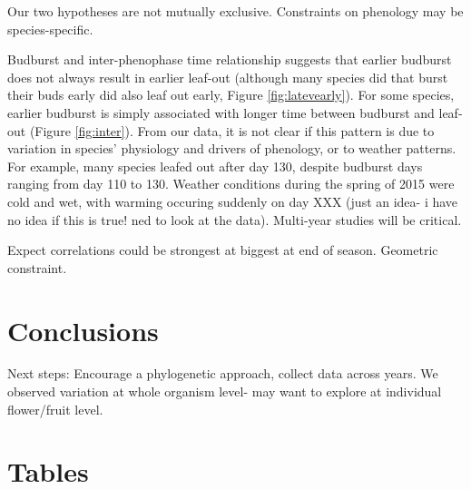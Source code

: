 \documentclass{article}
\begin{document}
\par Our two hypotheses are not mutually exclusive. Constraints on phenology may be species-specific. 
\par Budburst and inter-phenophase time relationship suggests that earlier budburst does not always result in earlier leaf-out (although many species did that burst their buds early did also leaf out early, Figure \ref{fig:latevearly}). For some species, earlier budburst is simply associated with longer time between budburst and leaf-out (Figure \ref{fig:inter}). From our data, it is not clear if this pattern is due to variation in species' physiology and drivers of phenology, or to weather patterns. For example, many species leafed out after day 130, despite budburst days ranging from day 110 to 130. Weather conditions during the spring of 2015 were cold and wet, with warming occuring suddenly on day XXX (just an idea- i have no idea if this is true! ned to look at the data). Multi-year studies will be critical. 
\par Expect correlations could be strongest  at biggest at end of season. Geometric constraint.
\section* {Conclusions}
Next steps: Encourage a phylogenetic approach, collect data across years. We observed variation at whole organism level- may want to explore at individual flower/fruit level. 
\section* {Tables}
\end{document}
